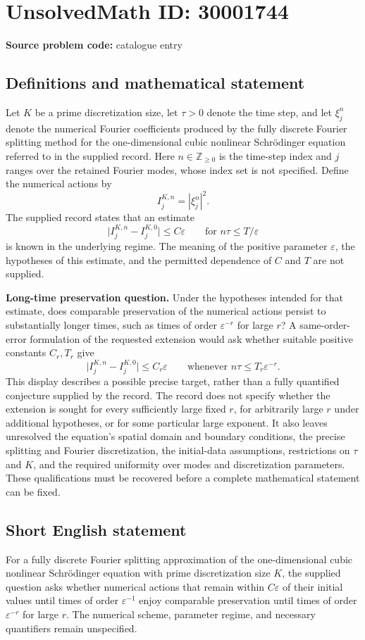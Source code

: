 \documentclass[11pt]{article}
\newcommand{\Z}{\mathbb{Z}}
\begin{document}
\section*{UnsolvedMath ID: 30001744}
\textbf{Source problem code:} catalogue entry
\subsection{Definitions and mathematical statement}
Let \(K\) be a prime discretization size, let \(\tau>0\) denote the time step, and let \(\xi_j^n\) denote the numerical Fourier coefficients produced by the fully discrete Fourier splitting method for the one-dimensional cubic nonlinear Schrödinger equation referred to in the supplied record. Here \(n\in\Z_{\geq 0}\) is the time-step index and \(j\) ranges over the retained Fourier modes, whose index set is not specified. Define the numerical actions by
\[
I_j^{K,n}=|\xi_j^n|^2.
\]
The supplied record states that an estimate
\[
\bigl|I_j^{K,n}-I_j^{K,0}\bigr|\leq C\varepsilon
\qquad\text{for }n\tau\leq T/\varepsilon
\]
is known in the underlying regime. The meaning of the positive parameter \(\varepsilon\), the hypotheses of this estimate, and the permitted dependence of \(C\) and \(T\) are not supplied.

\textbf{Long-time preservation question.} Under the hypotheses intended for that estimate, does comparable preservation of the numerical actions persist to substantially longer times, such as times of order \(\varepsilon^{-r}\) for large \(r\)? A same-order-error formulation of the requested extension would ask whether suitable positive constants \(C_r,T_r\) give
\[
\bigl|I_j^{K,n}-I_j^{K,0}\bigr|\leq C_r\varepsilon
\qquad\text{whenever }n\tau\leq T_r\varepsilon^{-r}.
\]
This display describes a possible precise target, rather than a fully quantified conjecture supplied by the record. The record does not specify whether the extension is sought for every sufficiently large fixed \(r\), for arbitrarily large \(r\) under additional hypotheses, or for some particular large exponent. It also leaves unresolved the equation's spatial domain and boundary conditions, the precise splitting and Fourier discretization, the initial-data assumptions, restrictions on \(\tau\) and \(K\), and the required uniformity over modes and discretization parameters. These qualifications must be recovered before a complete mathematical statement can be fixed.
\subsection{Short English statement}
For a fully discrete Fourier splitting approximation of the one-dimensional cubic nonlinear Schrödinger equation with prime discretization size \(K\), the supplied question asks whether numerical actions that remain within \(C\varepsilon\) of their initial values until times of order \(\varepsilon^{-1}\) enjoy comparable preservation until times of order \(\varepsilon^{-r}\) for large \(r\). The numerical scheme, parameter regime, and necessary quantifiers remain unspecified.
\end{document}

